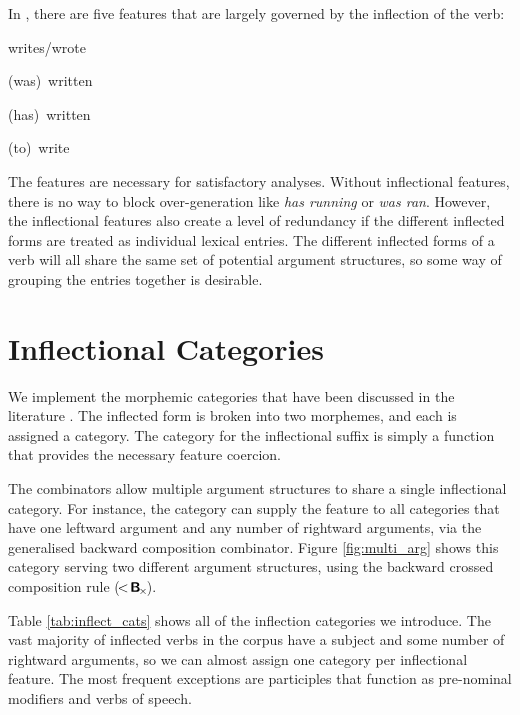 \documentclass[11pt]{article}
\begin{document}

In \ccgbank, there are five features that are largely governed by the inflection of the verb:

\begin{lexamples}
\item \gll writes/wrote
       \gln
       \glend
\item \gll (was)~written
      \gln
      \glend
\item \gll (has)~written
      \gln
      \glend
\item \gll (to)~write
      \gln
      \glend
\end{lexamples}

The features are necessary for satisfactory analyses. Without inflectional
features, there is no way to block over-generation like \emph{has running} or
\emph{was ran}. However, the inflectional features also create a level of
redundancy if the different inflected forms are treated as individual lexical
entries. The different inflected forms of a verb will all share the same set
of potential argument structures, so some way of grouping the entries together
is desirable.
\pagebreak


\section{Inflectional Categories}
\label{sec:inflect_cats}
We implement the morphemic categories that
have been discussed in the \ccg literature \citep{bozsahin:02}. The
inflected form is broken into two morphemes, and each is assigned a category.
The category for the inflectional suffix is simply a function that provides the
necessary feature coercion.

The \ccg combinators allow multiple argument structures to share a single
inflectional category. For instance, the 
category can supply the  feature to all categories that have one leftward
 argument and any number of rightward arguments, via the generalised
backward composition combinator. Figure \ref{fig:multi_arg} shows this
category serving two different argument structures, using the backward crossed
composition rule ($\!<\!\textbf{\textsf{B}}_{\!\times}\!$).

Table \ref{tab:inflect_cats}
shows all of the inflection categories we introduce. The
vast majority of inflected verbs in the corpus have a subject and some number
of rightward arguments, so we can almost assign one category per inflectional
feature. The most frequent exceptions are participles that function as
pre-nominal modifiers and verbs of speech.
\end{document}
